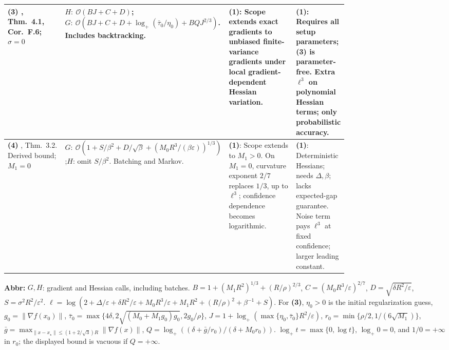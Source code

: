 \begin{table}[tp]
\begin{threeparttable}
\begin{tabularx}{\linewidth}{@{}>{\raggedright\arraybackslash}p{0.20\linewidth}>{\raggedright\arraybackslash}p{0.32\linewidth}>{\raggedright\arraybackslash}p{0.25\linewidth}>{\raggedright\arraybackslash}X@{}}
\midrule
\textbf{(3)} \citep{slhcLocalV1}, Thm.~4.1, Cor.~F.6; $\sigma=0$ &
$H:\ \mathcal{O}(BJ+C+D)$;\newline $G:\ \mathcal{O}(BJ+C+D+\log_+(\bar\tau_0/\eta_0)+BQJ^{2/3})$. Includes backtracking. &
\textbf{(1)}: Scope extends exact gradients to unbiased finite-variance gradients under local gradient-dependent Hessian variation. &
\textbf{(1)}: Requires all setup parameters; \textbf{(3)} is parameter-free. Extra $\ell^3$ on polynomial Hessian terms; only probabilistic accuracy. \\
\midrule
\textbf{(4)} \citep{slhcInexactV3}, Thm.~3.2. Derived bound; $M_1=0$ &
$G:\ \mathcal{O}(1+S/\beta^2+D/\sqrt\beta+(M_0R^3/(\beta\varepsilon))^{1/3})$;\newline $H$: omit $S/\beta^2$. Batching and Markov. &
\textbf{(1)}: Scope extends to $M_1>0$. On $M_1=0$, curvature exponent $2/7$ replaces $1/3$, up to $\ell^3$; confidence dependence becomes logarithmic. &
\textbf{(1)}: Deterministic Hessians; needs $\Delta,\beta$; lacks expected-gap guarantee. Noise term pays $\ell^3$ at fixed confidence; larger leading constant. \\
\bottomrule
\end{tabularx}
\begin{tablenotes}[flushleft]\footnotesize
\item[] \textbf{Abbr:} $G,H$: gradient and Hessian calls, including batches.
$B=1+(M_1R^2)^{1/3}+(R/\rho)^{2/3}$, $C=(M_0R^3/\varepsilon)^{2/7}$, $D=\sqrt{\delta R^2/\varepsilon}$, $S=\sigma^2R^2/\varepsilon^2$.
$\ell=\log(2+\Delta/\varepsilon+\delta R^2/\varepsilon+M_0R^3/\varepsilon+M_1R^2+(R/\rho)^2+\beta^{-1}+S)$.
For \textbf{(3)}, $\eta_0>0$ is the initial regularization guess, $g_0=\|\nabla f(x_0)\|$, $\bar\tau_0=\max\{4\delta,2\sqrt{(M_0+M_1g_0)g_0},2g_0/\rho\}$,
$J=1+\log_+(\max\{\eta_0,\bar\tau_0\}R^2/\varepsilon)$,
$r_0=\min\{\rho/2,1/(6\sqrt{M_1})\}$,
$\bar g=\max_{\|x-x_\star\|\le(1+2/\sqrt3)R}\|\nabla f(x)\|$,
$Q=\log_+((\delta+\bar g/r_0)/(\delta+M_0r_0))$.
$\log_+t=\max\{0,\log t\}$, $\log_+0=0$, and $1/0=+\infty$ in $r_0$; the displayed bound is vacuous if $Q=+\infty$.
\end{tablenotes}
\end{threeparttable}
\end{table}
\clearpage
